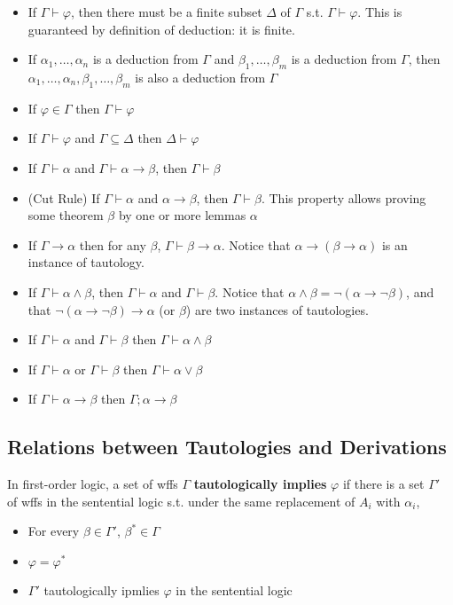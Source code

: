 \begin{itemize}
    \item If $\Gamma\vdash\varphi$, then there must be a finite subset $\Delta$ of $\Gamma$ s.t. $\Gamma\vdash\varphi$. This is guaranteed by definition of deduction: it is finite.
    \item If $\alpha_1,\dots,\alpha_n$ is a deduction from $\Gamma$ and $\beta_1,\dots,\beta_m$ is a deduction from $\Gamma$, then $\alpha_1,\dots,\alpha_n,\beta_1,\dots,\beta_m$ is also a deduction from $\Gamma$
    \item If $\varphi\in\Gamma$ then $\Gamma\vdash\varphi$
    \item If $\Gamma\vdash\varphi$ and $\Gamma\subseteq\Delta$ then $\Delta\vdash\varphi$
    \item If $\Gamma\vdash\alpha$ and $\Gamma\vdash\alpha\to\beta$, then $\Gamma\vdash\beta$
    \item (Cut Rule) If $\Gamma\vdash\alpha$ and $\alpha\to\beta$, then $\Gamma\vdash\beta$. This property allows proving some theorem $\beta$ by one or more lemmas $\alpha$
    \item If $\Gamma\to\alpha$ then for any $\beta$, $\Gamma\vdash\beta\to\alpha$. Notice that $\alpha\to\left( \beta\to\alpha \right)$ is an instance of tautology.
    \item If $\Gamma\vdash\alpha\wedge\beta$, then $\Gamma\vdash\alpha$ and $\Gamma\vdash\beta$. Notice that $\alpha\wedge\beta = \neg\left( \alpha\to\neg\beta \right)$, and that $\neg\left( \alpha\to\neg\beta \right) \to \alpha$ (or $\beta$) are two instances of tautologies.
    \item If $\Gamma\vdash\alpha$ and $\Gamma\vdash\beta$ then $\Gamma\vdash\alpha\wedge\beta$
    \item If $\Gamma\vdash\alpha$ or $\Gamma\vdash\beta$ then $\Gamma\vdash\alpha\vee\beta$
    \item If $\Gamma\vdash\alpha\to\beta$ then $\Gamma;\alpha\to\beta$
\end{itemize}

\subsection{Relations between Tautologies and Derivations}

\begin{definition}
    In first-order logic, a set of wffs $\Gamma$ \textbf{tautologically implies} $\varphi$ if there is a set $\Gamma'$ of wffs in the sentential logic s.t. under the same replacement of $A_i$ with $\alpha_i$,
    \begin{itemize}
        \item For every $\beta\in\Gamma'$, $\beta^*\in\Gamma$
        \item $\varphi=\varphi^*$
        \item $\Gamma'$ tautologically ipmlies $\varphi$ in the sentential logic
    \end{itemize}
\end{definition}

